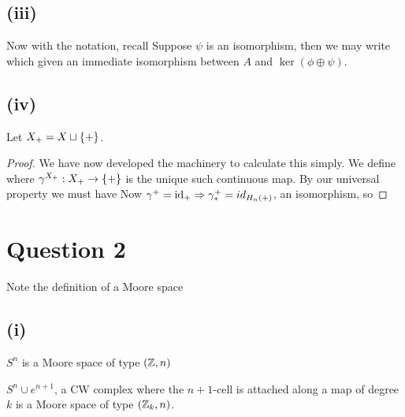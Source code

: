 \documentclass{article}
\begin{document}
\subsection{(iii)}
Now with the notation, recall
Suppose $\psi$ is an isomorphism, then we may write 
which given an immediate isomorphism between $A$ and $\ker(\phi \oplus \psi)$. 

\subsection{(iv)}
Let $X_+ = X \sqcup \left\{ + \right\}$. 
\begin{prop}
\end{prop}
\begin{proof}
We have now developed the machinery to calculate this simply.
We define 
where $\gamma^{X_+}:X_+ \to \left\{ + \right\}$ is the unique such continuous map. By our universal property we must have 
Now $\gamma^+ = \operatorname{id}_+ \Rightarrow \gamma^+_\ast = id_{H_n(+)}$, an isomorphism, so 
\end{proof}

\section{Question 2}
Note the definition of a Moore space
\subsection{(i)}
\begin{example}
$S^n$ is a Moore space of type $(\mathbb{Z},n)$
\end{example}

\begin{example}
$S^n \cup e^{n+1}$, a CW complex where the $n+1$-cell is attached along a map of degree $k$ is a Moore space of type $(\mathbb{Z}_k,n)$. 
\end{example}
\end{document}
